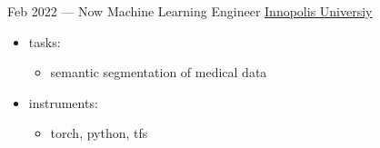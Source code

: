 \documentclass[letterpaper]{twentysecondcv} %
\begin{document}
\begin{twenty} %
        \twentyitem
        {Feb 2022 —}
        {Now}
        {Machine Learning Engineer}
        {  \href{https://https://innopolis.university/en/}{Innopolis Universiy}}
        {}
        {
        {\begin{itemize}
            \item tasks:
            {\begin{itemize}
                \item semantic segmentation of medical data
            \end{itemize}}
            \item instruments:
            {\begin{itemize}
                \item torch, python, tfs
            \end{itemize}
            }

        \end{itemize}}
        }
        \\


\end{twenty}
\end{document}
